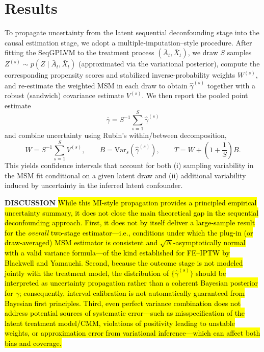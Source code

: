 \section{Results}
\label{results}
To propagate uncertainty from the latent sequential deconfounding stage into the causal estimation stage,
we adopt a multiple-imputation--style procedure.
After fitting the SeqGPLVM to the treatment process
$(\bar{A}_t, \bar{X}_t)$,
we draw $S$ samples $Z^{(s)} \sim p\!\left(Z \mid \bar{A}_t, \bar{X}_t\right)$
(approximated via the variational posterior),
compute the corresponding propensity scores and stabilized inverse-probability weights
$W^{(s)}$,
and re-estimate the weighted MSM in each draw to obtain
$\hat{\gamma}^{(s)}$
together with a robust (sandwich) covariance estimate $V^{(s)}$.
We then report the pooled point estimate
\[
\bar{\gamma} = S^{-1} \sum_{s=1}^{S} \hat{\gamma}^{(s)}
\]
and combine uncertainty using Rubin's within/between decomposition,
\[
W = S^{-1} \sum_{s=1}^{S} V^{(s)}, 
\qquad
B = \mathrm{Var}_s\!\left(\hat{\gamma}^{(s)}\right),
\qquad
T = W + \left(1 + \frac{1}{S}\right) B .
\]
This yields confidence intervals that account for both
(i) sampling variability in the MSM fit conditional on a given latent draw and
(ii) additional variability induced by uncertainty in the inferred latent confounder.

\textbf{DISCUSSION}
\hl{While this MI-style propagation provides a principled empirical uncertainty summary,
it does not close the main theoretical gap in the sequential deconfounding approach.
First, it does not by itself deliver a large-sample result for the \emph{overall}
two-stage estimator---i.e., conditions under which the plug-in (or draw-averaged)
MSM estimator is consistent and $\sqrt{N}$-asymptotically normal with a valid variance
formula---of the kind established for FE--IPTW by Blackwell and Yamauchi.
Second, because the outcome stage is not modeled jointly with the treatment model,
the distribution of $\{\hat{\gamma}^{(s)}\}$ should be interpreted as uncertainty
propagation rather than a coherent Bayesian posterior for $\gamma$; consequently,
interval calibration is not automatically guaranteed from Bayesian first principles.
Third, even perfect variance combination does not address potential sources of
systematic error---such as misspecification of the latent treatment model/CMM,
violations of positivity leading to unstable weights, or approximation error from
variational inference---which can affect both bias and coverage.}